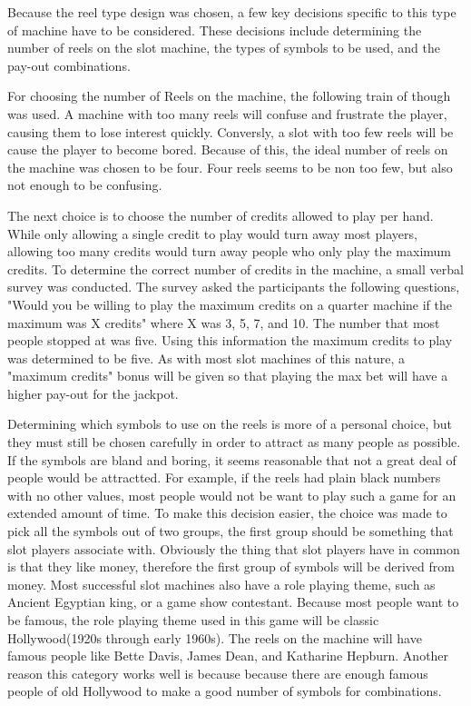 
Because the reel type design was chosen, a few key decisions specific to this type of machine have to be considered. These decisions include determining the number of reels on the slot machine, the types of symbols to be used, and the pay-out combinations.

For choosing the number of Reels on the machine, the following train of though was used.  A machine with too many reels will confuse and frustrate the player, causing them to lose interest quickly. Conversly, a slot with too few reels will be cause the player to become bored.  Because of this, the ideal number of reels on the machine was chosen to be four.  Four reels seems to be non too few, but also not enough to be confusing.

The next choice is to choose the number of credits allowed to play per hand.  While only allowing a single credit to play would turn away most players, allowing too many credits would turn away people who only play the maximum credits.  To determine the correct number of credits in the machine, a small verbal survey was conducted.  The survey asked the participants the following questions, "Would you be willing to play the maximum credits on a quarter machine if the maximum was X credits" where X was 3, 5, 7, and 10.  The number that most people stopped at was five.  Using this information the maximum credits to play was determined to be five.  As with most slot machines of this nature, a "maximum credits" bonus will be given so that playing the max bet will have a higher pay-out for the jackpot.

Determining which symbols to use on the reels is more of a personal choice, but they must still be chosen carefully in order to attract as many people as possible.  If the symbols are bland and boring, it seems reasonable that not a great deal of people would be attractted.  For example, if the reels had plain black numbers with no other values, most people would not be want to play such a game for an extended amount of time.  To make this decision easier, the choice was made to pick all the symbols out of two groups, the first group should be something that slot players associate with.  Obviously the thing that slot players have in common is that they like money, therefore the first group of symbols will be derived from money.  Most successful slot machines also have a role playing theme, such as Ancient Egyptian king, or a game show contestant.  Because most people want to be famous, the role playing theme used in this game will be classic Hollywood(1920s through early 1960s).  The reels on the machine will have famous people like Bette Davis, James Dean, and Katharine Hepburn.  Another reason this category works well is because because there are enough famous people of old Hollywood to make a good number of symbols for combinations.

